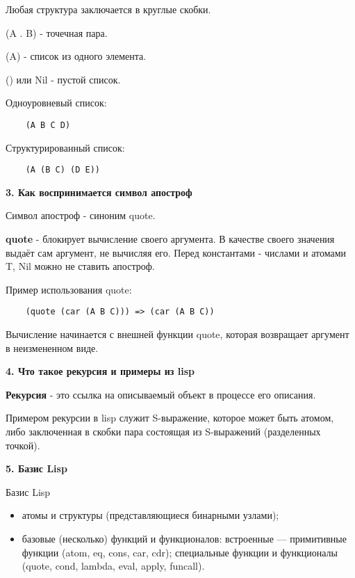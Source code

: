 Любая структура заключается в круглые скобки.

(A . B) - точечная пара.

(A) - список из одного элемента.

() или Nil - пустой список.

Одноуровневый список:
\begin{lstlisting}
	(A B C D)
\end{lstlisting}

Структурированный список:
\begin{lstlisting}
	(A (B C) (D E))
\end{lstlisting}

\textbf{3. Как воспринимается символ апостроф}

Символ апостроф - синоним quote.

\textbf{quote} - блокирует вычисление своего аргумента.
В качестве своего значения выдаёт сам аргумент, не вычисляя его.
Перед константами - числами и атомами T, Nil можно не ставить апостроф.

Пример использования quote:
\begin{lstlisting}
	(quote (car (A B C))) => (car (A B C))
\end{lstlisting}


Вычисление начинается с внешней функции quote, которая возвращает аргумент в неизмененном виде.

\textbf{4. Что такое рекурсия и примеры из lisp}

\textbf{Рекурсия} - это ссылка на описываемый объект в процессе его описания.

Примером рекурсии в lisp служит S-выражение, которое может быть атомом,
либо заключенная в скобки пара состоящая из S-выражений (разделенных точкой).


\textbf{5. Базис Lisp}

Базис Lisp 
\begin{itemize}
	\item атомы и структуры (представляющиеся бинарными узлами);
	\item базовые (несколько) функций и функционалов: встроенные — примитивные
	функции (atom, eq, cons, car, cdr); специальные функции и функционалы (quote,
	cond, lambda, eval, apply, funcall).
\end{itemize}

